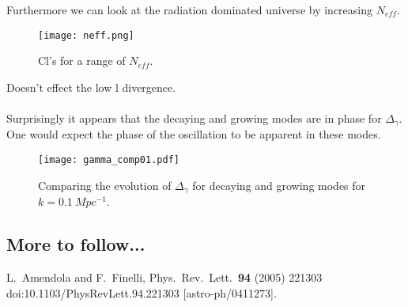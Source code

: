 \documentclass[12pt]{article}
\numberwithin{equation}{section}
\begin{document}
Furthermore we can look at the radiation dominated universe by increasing $N_{eff}$. 

\begin{figure}[h!]
\begin{center}
\texttt{[image: neff.png]}
\vspace{5mm}
\caption{Cl's for a range of $N_{eff}$.}
\label{Neff}
\end{center}
\end{figure}

Doesn't effect the low l divergence. 
\\
\\
Surprisingly it appears that the decaying and growing modes are in phase for $\Delta_\gamma$. One would expect the phase of the oscillation to be apparent in these modes. 

\begin{figure}[h!]
\begin{center}
\texttt{[image: gamma\_comp01.pdf]}
\vspace{5mm}
\caption{Comparing the evolution of $\Delta_\gamma$ for decaying and growing modes for $k = 0.1 \ Mpc^{-1}$.}
\label{gamma_comp} 
\end{center}
\end{figure}

\subsection{More to follow...}
 

\begin{thebibliography}{99}

  L.~Amendola and F.~Finelli,
  Phys.\ Rev.\ Lett.\  {\bf 94} (2005) 221303
  doi:10.1103/PhysRevLett.94.221303
  [astro-ph/0411273].

	

\end{thebibliography}
\end{document}
